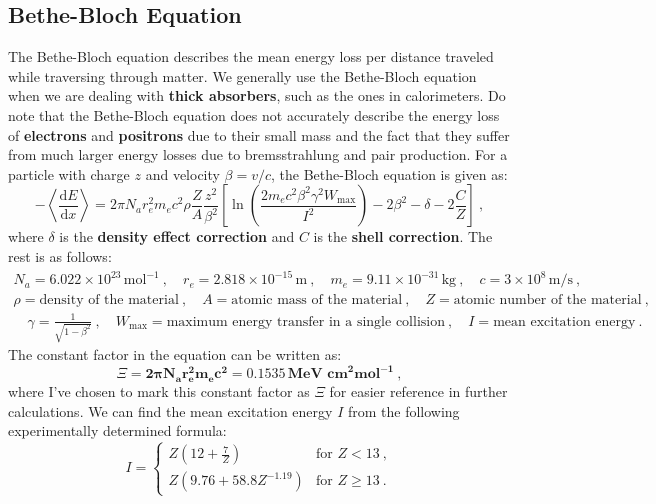 \documentclass[10pt, titlepage, a4paper]{article}
\newcommand{\dd}{\mathrm{d}}
\numberwithin{equation}{section}
\begin{document}
\subsection{Bethe-Bloch Equation}
The Bethe-Bloch equation describes the mean energy loss per distance traveled while traversing through matter.
We generally use the Bethe-Bloch equation when we are dealing with \textbf{thick absorbers}, such as the ones in calorimeters.
Do note that the Bethe-Bloch equation does not accurately describe the energy loss of \textbf{electrons} and \textbf{positrons} 
due to their small mass and the fact that they suffer from much larger energy losses due to bremsstrahlung and pair production.
For a particle with charge $z$ and velocity $\beta = v/c$, the Bethe-Bloch equation is given as:
%
\begin{equation}
    -\left\langle \frac{\dd E}{\dd x} \right\rangle = 2\pi N_a r_e^2 m_e c^2 \rho \frac{Z}{A}\frac{z^2}{\beta^2}\left[\ln\left(\frac{2m_ec^2\beta^2\gamma^2W_{\text{max}}}{I^2}\right) - 2\beta^2 - \delta - 2\frac{C}{Z}\right]\>,
    \label{eq:bethe-bloch}
\end{equation}
%
where $\delta$ is the \textbf{density effect correction} and $C$ is the \textbf{shell correction}. The rest is as follows:
%
\begin{gather*}
    N_a = 6.022 \times 10^{23}\,\text{mol}^{-1}\>, \quad r_e = 2.818 \times 10^{-15}\,\text{m}\>, \quad m_e = 9.11 \times 10^{-31}\,\text{kg}\>, \quad c = 3 \times 10^8\,\text{m/s}\>, \nonumber \\
    \rho = \text{density of the material}\>, \quad A = \text{atomic mass of the material}\>, \quad Z = \text{atomic number of the material}\>, \\
    \quad \gamma = \frac{1}{\sqrt{1-\beta^2}}\>, \quad W_{\text{max}} = \text{maximum energy transfer in a single collision}\>, \quad I = \text{mean excitation energy}\>. \nonumber
\end{gather*}
%
The constant factor in the equation can be written as:
%
\begin{equation}
    \Xi = \bm{2\pi N_a r_e^2 m_e c^2 = 0.1535\,\textbf{MeV cm}^2\textbf{mol}^{-1}}\>,
    \label{eq:bb-constant}
\end{equation}
%
where I've chosen to mark this constant factor as $\Xi$ for easier reference in further calculations.
We can find the mean excitation energy $I$ from the following experimentally determined formula:
%
\begin{equation}
    I = \begin{cases}
        Z(12 + \frac{7}{Z}) & \text{for } Z < 13\>, \\
        Z(9.76 + 58.8Z^{-1.19}) & \text{for } Z \geq 13\>.
    \end{cases}
    \label{eq:I}
\end{equation}
\end{document}
